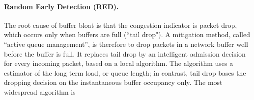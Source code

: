 \paragraph{Random Early Detection (RED).}
The root cause of buffer bloat is that the congestion indicator is packet drop, which occurs only when buffers are full (``tail drop"). A mitigation method, called ``active queue management'', is therefore to drop packets in a network buffer well before the buffer is full. It replaces tail drop by an intelligent
admission decision for every incoming packet, based on a local
algorithm.  The algorithm uses a estimator of the long term load,
or queue length; in contrast, tail drop bases the dropping
decision on the instantaneous buffer occupancy only. The most widespread algorithm is
%
%
%
%
